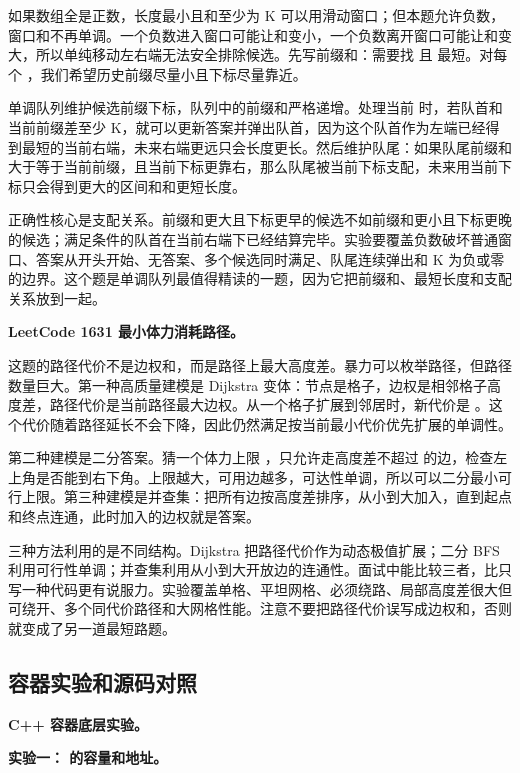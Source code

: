 如果数组全是正数，长度最小且和至少为 K 可以用滑动窗口；但本题允许负数，窗口和不再单调。一个负数进入窗口可能让和变小，一个负数离开窗口可能让和变大，所以单纯移动左右端无法安全排除候选。先写前缀和：需要找  且  最短。对每个 ，我们希望历史前缀尽量小且下标尽量靠近。

单调队列维护候选前缀下标，队列中的前缀和严格递增。处理当前  时，若队首和当前前缀差至少 K，就可以更新答案并弹出队首，因为这个队首作为左端已经得到最短的当前右端，未来右端更远只会长度更长。然后维护队尾：如果队尾前缀和大于等于当前前缀，且当前下标更靠右，那么队尾被当前下标支配，未来用当前下标只会得到更大的区间和和更短长度。

正确性核心是支配关系。前缀和更大且下标更早的候选不如前缀和更小且下标更晚的候选；满足条件的队首在当前右端下已经结算完毕。实验要覆盖负数破坏普通窗口、答案从开头开始、无答案、多个候选同时满足、队尾连续弹出和 K 为负或零的边界。这个题是单调队列最值得精读的一题，因为它把前缀和、最短长度和支配关系放到一起。

\noindent\textbf{LeetCode 1631 最小体力消耗路径。}

这题的路径代价不是边权和，而是路径上最大高度差。暴力可以枚举路径，但路径数量巨大。第一种高质量建模是 Dijkstra 变体：节点是格子，边权是相邻格子高度差，路径代价是当前路径最大边权。从一个格子扩展到邻居时，新代价是 。这个代价随着路径延长不会下降，因此仍然满足按当前最小代价优先扩展的单调性。

第二种建模是二分答案。猜一个体力上限 ，只允许走高度差不超过  的边，检查左上角是否能到右下角。上限越大，可用边越多，可达性单调，所以可以二分最小可行上限。第三种建模是并查集：把所有边按高度差排序，从小到大加入，直到起点和终点连通，此时加入的边权就是答案。

三种方法利用的是不同结构。Dijkstra 把路径代价作为动态极值扩展；二分 BFS 利用可行性单调；并查集利用从小到大开放边的连通性。面试中能比较三者，比只写一种代码更有说服力。实验覆盖单格、平坦网格、必须绕路、局部高度差很大但可绕开、多个同代价路径和大网格性能。注意不要把路径代价误写成边权和，否则就变成了另一道最短路题。

\subsection{容器实验和源码对照}

\noindent\textbf{C++ 容器底层实验。}

\noindent\textbf{实验一： 的容量和地址。}

